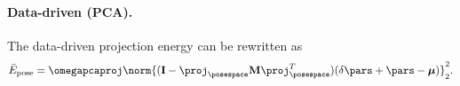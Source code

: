\paragraph*{Data-driven (PCA).} 
The data-driven projection energy can be rewritten as
\begin{equation*}
\bar{E}_{\text{pose}}  = \omegapcaproj \norm{(\mathbf{I}  - \proj_\posespace\mathbf{M}\proj_\posespace^T)(\delta{\pars} + \pars - \boldsymbol{\mu}) }_2^2.
\end{equation*}
%
%
\vspace{-.3in}
